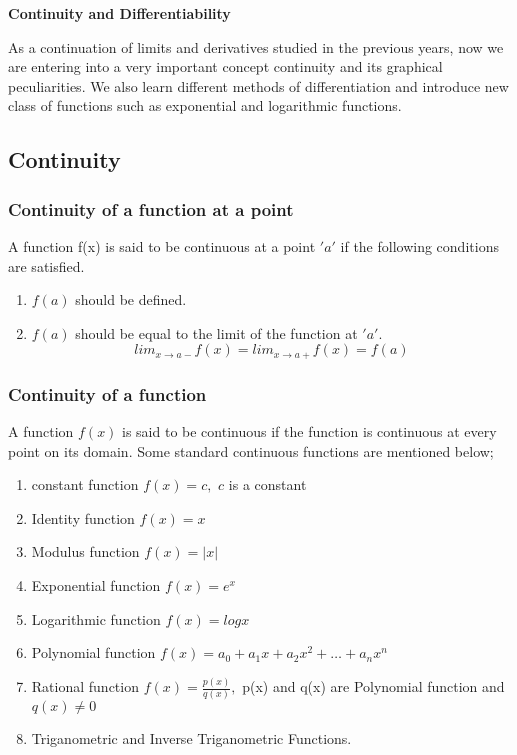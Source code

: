 \documentclass[12pt]{article}
\begin{document}
\begin{center}
    {\LARGE \textbf{Continuity and Differentiability} }
\end{center}

\begin{multicols*}{2}
    As a continuation of limits and derivatives studied in the previous years, now we are entering into a very important concept continuity and its graphical peculiarities. We also learn different methods of differentiation and introduce new class of functions such as exponential and logarithmic functions.

\subsection*{Continuity}
 \subsubsection*{ Continuity of a function at a point}
 A function f(x) is said to be continuous at a point $'a'$ if the following conditions are satisfied.
 \begin{enumerate}
    \item $f(a)$ should be defined.
    \item $f(a)$ should be equal to the limit of the function at $'a'$. $$lim_{x \rightarrow a-}f(x)=lim_{x \rightarrow a+}f(x)=f(a)$$
 \end{enumerate}

 \subsubsection*{Continuity of a function}
 A function $f(x)$ is said to be continuous if the function is continuous at every point on its domain. Some standard continuous functions are mentioned below;
 \begin{enumerate}
    \item constant function $f(x)=c,$  $c$ is a constant 
    \item Identity function $f(x)=x$
    \item Modulus function $f(x)=|x|$
    \item Exponential function $f(x)=e^x$
    \item Logarithmic function $f(x)=log x$
    \item Polynomial function $f(x)=a_0 +a_1 x +a_2 x^2 +\dots +a_n x^n$
    \item Rational function $f(x)=\frac{p(x)}{q(x)},$ p(x) and q(x) are Polynomial function and $q(x) \not = 0$
    \item Triganometric and Inverse Triganometric Functions.
 \end{enumerate}


\end{multicols*}
\end{document}
